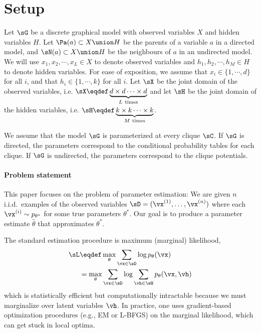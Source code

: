 \section{Setup}
\label{sec:setup}

Let $\sG$ be a discrete graphical model with observed variables $X$ and
  hidden variables $H$.
Let $\Pa(a) \subset X \union H$ be the parents of a variable $a$ in a directed
  model, and $\sN(a) \subset X \union H$ be the neighbours of $a$ in an
  undirected model.
We will use $x_1, x_2, \cdots, x_L \in X$ to denote observed variables and
  $h_1, h_2, \cdots, h_M \in H$ to denote hidden variables.
For ease of exposition, we assume that $x_i \in \{1, \cdots, d\}$ for
  all $i$, and that $h_i \in \{1, \cdots, k\}$ for all $i$.
Let $\sX$ be the joint domain of the observed variables, i.e. $\sX \eqdef
  \underbrace{d \times d \cdots \times d}_{L ~\textrm{times}}$ and
let $\sH$ be the joint domain of the hidden variables, i.e. $\sH \eqdef
  \underbrace{k \times k \cdots \times k}_{M ~\textrm{times}}$.

We assume that the model $\sG$ is parameterized at every clique $\sC$.
If $\sG$ is directed, the parameters correspond to
  the conditional probability tables for each clique.
If $\sG$ is undirected, the parameters correspond to the clique
  potentials.

\paragraph{Problem statement}

This paper focuses on the problem of parameter estimation:
We are given $n$ i.i.d.~examples of the observed variables $\sD
  = (\vx^{(1)}, \dots, \vx^{(n)})$ where each $\vx^{(i)} \sim p_{\theta^*}$ for
  some true parameters $\theta^*$.
Our goal is to produce a parameter estimate $\hat\theta$ that
  approximates $\theta^*$.

The standard estimation procedure is maximum (marginal) likelihood,
  \begin{align*}
    \sL &\eqdef \max_{\theta} \sum_{\vx \in \sD} \log p_\theta(\vx) \\
        &=      \max_{\theta} \sum_{\vx \in \sD} \log \sum_{\vh \in \sH} p_\theta(\vx,\vh)
  \end{align*}
  which is statistically efficient but computationally intractable
  because we must marginalize over latent variables $\vh$.
In practice, one uses gradient-based optimization procedures (e.g., EM
  or L-BFGS) on the marginal likelihood, which can get stuck in local
  optima.

